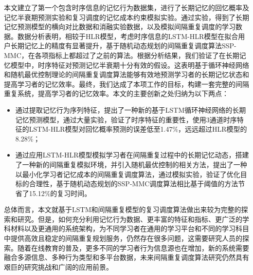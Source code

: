 \begin{conclusions}
本文建立了第一个包含时序信息的记忆行为数据集，进行了长期记忆的回忆概率及记忆半衰期预测实验和复习调度的记忆成本约束模拟实验。通过实验，得到了长期记忆预测模型的横向对比数据和消融实验数据，以及模拟间隔重复调度的学习数据。数据分析表明，相较于HLR模型，考虑时序信息的LSTM-HLR模型在拟合用户长期记忆上的精度有显著提升，基于随机动态规划的间隔重复调度算法SSP-MMC，在各项指标上都超过了之前的算法。根据分析结果，我们验证了在长期记忆模型中，时序特征对预测记忆半衰期十分有效的假设。这表明基于循环神经网络和随机最优控制理论的间隔重复调度算法能够有效地预测学习者的长期记忆状态和提高学习者的记忆效率。最终，我们达成了本项工作的目标，构建一套完整的间隔重复系统，提高学习者的记忆效率。本文的主要创新之处归纳为以下两点：
\begin{itemize}
    \item 通过提取记忆行为序列特征，提出了一种新的基于LSTM循环神经网络的长期记忆预测模型，通过大量实验，验证了时序特征的重要性，使用3通道时序特征的LSTM-HLR模型对回忆概率预测的误差低至1.47\%，远远超过HLR模型的8.28\%；
    \item 通过应用LSTM-HLR模型模拟学习者在间隔重复过程中的长期记忆动态，搭建了一种新的间隔重复模拟环境，并引入随机最优控制的相关方法，提出了一种以最小化学习者记忆成本的间隔重复调度算法，通过模拟实验，验证了优化目标的合理性，基于随机动态规划的SSP-MMC调度算法相比基于阈值的方法节省了15.12\%的复习时间。
\end{itemize}

总体而言，本文就基于LSTM和间隔重复模型的复习调度算法做出来较为完整的探索和研究。但是，如何充分利用记忆行为数据、更丰富的特征和指标、更广泛的学科材料以及更通用的系统架构，为不同学习者在通用的学习平台和不同的学习科目中提供高效且稳定的间隔重复规划服务，仍然存在很多问题，这需要研究人员的探索。随着在线教育的普及，更多不同的学习者行为信息源也在增加，新的系统需要融合多源信息、多种行为类型和多平台数据，未来间隔重复调度算法研究仍然具有艰巨的研究挑战和广阔的应用前景。
\end{conclusions}
